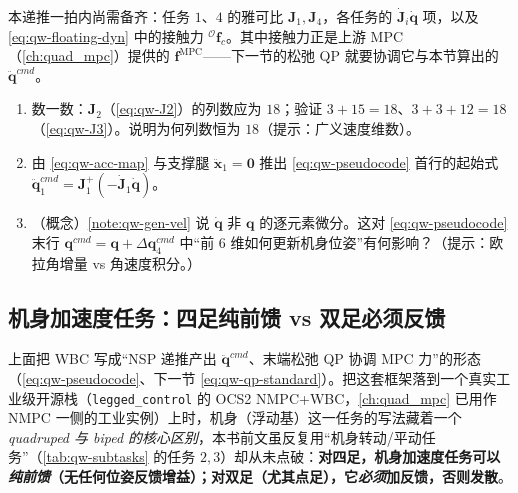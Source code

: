 本递推一拍内尚需备齐：任务 $1$、$4$ 的雅可比 $\boldsymbol{J}_1,\boldsymbol{J}_4$，各任务的 $\dot{\boldsymbol{J}}_i\dot{\boldsymbol{q}}$ 项，以及 \cref{eq:qw-floating-dyn} 中的接触力 ${}^{\mathcal{O}}\boldsymbol{f}_c$。其中接触力正是上游 MPC（\cref{ch:quad_mpc}）提供的 $\boldsymbol{f}^{\mathrm{MPC}}$——下一节的松弛 QP 就要协调它与本节算出的 $\ddot{\boldsymbol{q}}^{cmd}$。

\begin{practice}
\begin{enumerate}
  \item 数一数：$\boldsymbol{J}_2$（\cref{eq:qw-J2}）的列数应为 $18$；验证 $3+15=18$、$3+3+12=18$（\cref{eq:qw-J3}）。说明为何列数恒为 $18$（提示：广义速度维数）。
  \item 由 \cref{eq:qw-acc-map} 与支撑腿 $\ddot{\boldsymbol{x}}_1=\mathbf{0}$ 推出 \cref{eq:qw-pseudocode} 首行的起始式 $\ddot{\boldsymbol{q}}_1^{cmd}=\boldsymbol{J}_1^+(-\dot{\boldsymbol{J}}_1\dot{\boldsymbol{q}})$。
  \item （概念）\cref{note:qw-gen-vel} 说 $\dot{\boldsymbol{q}}$ 非 $\boldsymbol{q}$ 的逐元素微分。这对 \cref{eq:qw-pseudocode} 末行 $\boldsymbol{q}^{cmd}=\boldsymbol{q}+\Delta\boldsymbol{q}_4^{cmd}$ 中“前 $6$ 维如何更新机身位姿”有何影响？（提示：欧拉角增量 vs 角速度积分。）
\end{enumerate}
\end{practice}

\subsection{机身加速度任务：四足纯前馈 vs 双足必须反馈}
\label{subsec:qw-base-feedforward}

上面把 WBC 写成“NSP 递推产出 $\ddot{\boldsymbol{q}}^{cmd}$、末端松弛 QP 协调 MPC 力”的形态（\cref{eq:qw-pseudocode}、下一节 \cref{eq:qw-qp-standard}）。把这套框架落到一个真实工业级开源栈（\texttt{legged\_control} 的 OCS2 NMPC+WBC，\cref{ch:quad_mpc} 已用作 NMPC 一侧的工业实例）上时，机身（浮动基）这一任务的写法藏着一个\emph{quadruped 与 biped 的核心区别}，本书前文虽反复用“机身转动/平动任务”（\cref{tab:qw-subtasks} 的任务 $2,3$）却从未点破：\textbf{对四足，机身加速度任务可以\emph{纯前馈}（无任何位姿反馈增益）；对双足（尤其点足），它\emph{必须}加反馈，否则发散}。

